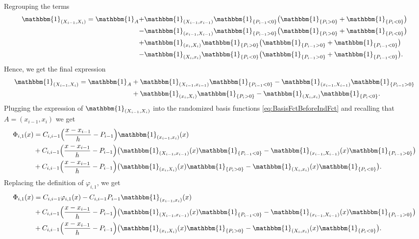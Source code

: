 \documentclass{siamart1116}
\numberwithin{theorem}{section}
\renewcommand{\phi}{\varphi}
\newcommand{\ind}[1]{\mathbbm{1}_{#1}}
\begin{document}
Regrouping the terms
\begin{equation}
\begin{aligned}
\ind{(X_{i-1}, X_i)} = \ind{A} + &\ind{(X_{i-1}, x_{i-1})}\ind{\{P_{i-1} < 0\}}\big(\ind{\{P_i > 0\}} + \ind{\{P_i < 0\}}\big)\\
					 - &\ind{(x_{i-1}, X_{i-1})}\ind{\{P_{i-1} > 0\}}\big(\ind{\{P_i > 0\}} + \ind{\{P_i < 0\}}\big) \\
					 + &\ind{(x_i, X_i)}\ind{\{P_i > 0\}}\big(\ind{\{P_{i-1} > 0\}} + \ind{\{P_{i-1} < 0\}}\big) \\
					 - &\ind{(X_i, x_i)}\ind{\{P_i < 0\}}\big(\ind{\{P_{i-1} > 0\}} + \ind{\{P_{i-1} < 0\}}\big).
\end{aligned}
\end{equation}
Hence, we get the final expression
\begin{equation}
\begin{aligned}
\ind{(X_{i-1}, X_i)} = \ind{A} &+ \ind{(X_{i-1}, x_{i-1})}\ind{\{P_{i-1} < 0\}} - \ind{(x_{i-1}, X_{i-1})}\ind{\{P_{i-1} > 0\}}	\\
							   &+ \ind{(x_i, X_i)}\ind{\{P_i > 0\}} - \ind{(X_i, x_i)}\ind{\{P_i < 0\}}.
\end{aligned}
\end{equation}
Plugging the expression of $\ind{(X_{i-1}, X_i)}$ into the randomized basis functions \eqref{eq:BasisFctBeforeIndFct} and recalling that $A = (x_{i-1}, x_i)$ we get
\begin{equation}
\begin{aligned}
	\Phi_{i, 1}(x) &= C_{i, i-1}\Big(\frac{x - x_{i-1}}{h} - P_{i-1}\Big)\ind{(x_{i-1}, x_i)}(x) \\
				   &+ C_{i, i-1}\Big(\frac{x - x_{i-1}}{h} - P_{i-1}\Big)\big(\ind{(X_{i-1}, x_{i-1})}(x)\ind{\{P_{i-1} < 0\}} - \ind{(x_{i-1}, X_{i-1})}(x)\ind{\{P_{i-1} > 0\}}\big)\\
				   &+ C_{i, i-1}\Big(\frac{x - x_{i-1}}{h} - P_{i-1}\Big)\big(\ind{(x_i, X_i)}(x)\ind{\{P_i > 0\}} - \ind{(X_i, x_i)}(x)\ind{\{P_i < 0\}}\big).
\end{aligned}
\end{equation}
Replacing the definition of $\phi_{i, 1}$, we get
\begin{equation}
\begin{aligned}
	\Phi_{i, 1}(x) &= C_{i, i-1}\phi_{i, 1}(x) - C_{i, i-1}P_{i-1}\ind{(x_{i-1}, x_i)}(x) \\
				   &+ C_{i, i-1}\Big(\frac{x - x_{i-1}}{h} - P_{i-1}\Big)\big(\ind{(X_{i-1}, x_{i-1})}(x)\ind{\{P_{i-1} < 0\}} - \ind{(x_{i-1}, X_{i-1})}(x)\ind{\{P_{i-1} > 0\}}\big)\\
				   &+ C_{i, i-1}\Big(\frac{x - x_{i-1}}{h} - P_{i-1}\Big)\big(\ind{(x_i, X_i)}(x)\ind{\{P_i > 0\}} - \ind{(X_i, x_i)}(x)\ind{\{P_i < 0\}}\big).
\end{aligned}
\end{equation}
\end{document}
